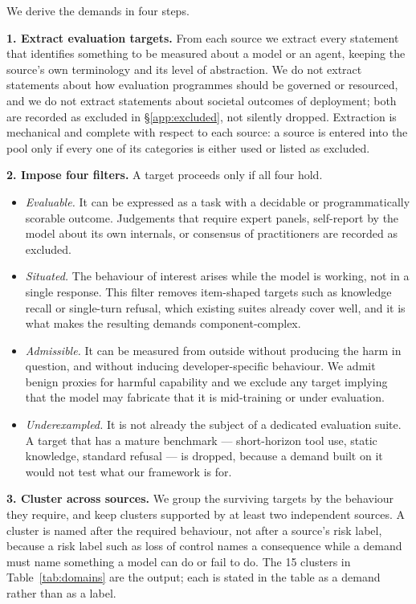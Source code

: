 We derive the demands in four steps.

\textbf{1. Extract evaluation targets.} From each source we extract every statement that identifies something to be measured about a model or an agent, keeping the source's own terminology and its level of abstraction. We do not extract statements about how evaluation programmes should be governed or resourced, and we do not extract statements about societal outcomes of deployment; both are recorded as excluded in \S\ref{app:excluded}, not silently dropped. Extraction is mechanical and complete with respect to each source: a source is entered into the pool only if every one of its categories is either used or listed as excluded.

\textbf{2. Impose four filters.} A target proceeds only if all four hold.

\begin{itemize}
\item \emph{Evaluable.} It can be expressed as a task with a decidable or programmatically scorable outcome. Judgements that require expert panels, self-report by the model about its own internals, or consensus of practitioners are recorded as excluded.
\item \emph{Situated.} The behaviour of interest arises while the model is working, not in a single response. This filter removes item-shaped targets such as knowledge recall or single-turn refusal, which existing suites already cover well, and it is what makes the resulting demands component-complex.
\item \emph{Admissible.} It can be measured from outside without producing the harm in question, and without inducing developer-specific behaviour. We admit benign proxies for harmful capability and we exclude any target implying that the model may fabricate that it is mid-training or under evaluation.
\item \emph{Underexampled.} It is not already the subject of a dedicated evaluation suite. A target that has a mature benchmark --- short-horizon tool use, static knowledge, standard refusal --- is dropped, because a demand built on it would not test what our framework is for.
\end{itemize}

\textbf{3. Cluster across sources.} We group the surviving targets by the behaviour they require, and keep clusters supported by at least two independent sources. A cluster is named after the required behaviour, not after a source's risk label, because a risk label such as loss of control names a consequence while a demand must name something a model can do or fail to do. The 15 clusters in Table~\ref{tab:domains} are the output; each is stated in the table as a demand rather than as a label.

